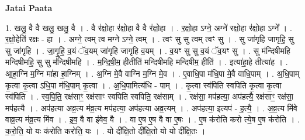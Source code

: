 \documentclass[17pt]{extarticle}
\begin{document}
\textbf{Jatai Paata} \newline

1. खलु॒ वै वै खलु॒ खलु॒ वै । . वै र॑क्षो॒हा र॑क्षो॒हा वै वै र॑क्षो॒हा । . र॒क्षो॒हा ऽग्ने॒ अग्ने॑ रक्षो॒हा र॑क्षो॒हा ऽग्ने᳚ । . र॒क्षो॒हेति॑ रक्षः - हा । . अग्ने॒ त्वम् त्व मग्ने ऽग्ने॒ त्वम् । . त्वꣳ सु सु त्वम् त्वꣳ सु । . सु जा॑गृहि जागृहि॒ सु सु जा॑गृहि । . जा॒गृ॒हि॒ व॒यं ॅव॒यम् जा॑गृहि जागृहि व॒यम् । . व॒यꣳ सु सु व॒यं ॅव॒यꣳ सु । . सु म॑न्दिषीमहि मन्दिषीमहि॒ सु सु म॑न्दिषीमहि । . म॒न्दि॒षी॒म॒ हीतीति॑ मन्दिषीमहि मन्दिषीम॒ हीति॑ । . इत्या॑हा॒हे तीत्या॑ह । . आ॒हा॒ग्नि म॒ग्नि मा॑हा हा॒ग्निम् । . अ॒ग्नि मे॒वै वाग्नि म॒ग्नि मे॒व । . ए॒वाधि॒पा म॑धि॒पा मे॒वै वाधि॒पाम् । . अ॒धि॒पाम् कृ॒त्वा कृ॒त्वा ऽधि॒पा म॑धि॒पाम् कृ॒त्वा । . अ॒धि॒पामित्य॑धि - पाम् । . कृ॒त्वा स्व॑पिति स्वपिति कृ॒त्वा कृ॒त्वा स्व॑पिति । . स्व॒पि॒ति॒ रक्ष॑साꣳ॒॒ रक्ष॑साꣳ स्वपिति स्वपिति॒ रक्ष॑साम् । . रक्ष॑सा॒ मप॑हत्या॒ अप॑हत्यै॒ रक्ष॑साꣳ॒॒ रक्ष॑सा॒ मप॑हत्यै । . अप॑हत्या अव्र॒त्य म॑व्र॒त्य मप॑हत्या॒ अप॑हत्या अव्र॒त्यम् । . अप॑हत्या॒ इत्यप॑ - ह॒त्यै॒ । . अ॒व्र॒त्य मि॑वे वाव्र॒त्य म॑व्र॒त्य मि॑व । . इ॒व॒ वै वा इ॑वेव॒ वै । . वा ए॒ष ए॒ष वै वा ए॒षः । . ए॒ष क॑रोति करो त्ये॒ष ए॒ष क॑रोति । . क॒रो॒ति॒ यो यः क॑रोति करोति॒ यः । . यो दी᳚क्षि॒तो दी᳚क्षि॒तो यो यो दी᳚क्षि॒तः । \newline
\end{document}
